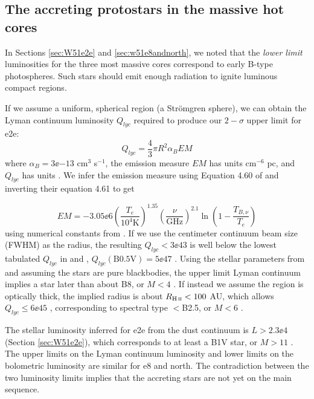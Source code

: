 \documentclass{emulateapj}
\begin{document}
\subsection{The accreting protostars in the massive hot cores}
\label{sec:stellarproperties}
In Sections \ref{sec:W51e2e} and \ref{sec:w51e8andnorth}, we noted that the
\emph{lower limit} luminosities for the three most massive cores correspond to
early B-type photospheres.  Such stars should emit enough radiation to ignite
luminous compact \hii regions. %

If we assume a uniform, spherical \hii region (a Strömgren sphere), we can
obtain the Lyman continuum luminosity $Q_{lyc}$ required to produce our
$2-\sigma$ upper limit for e2e:
\begin{equation}
    Q_{lyc} = \frac{4}{3} \pi R^2 \alpha_B EM
\end{equation}
where $\alpha_B = 3\ee{-13}$ cm$^{3}$ s$^{-1}$, the emission measure $EM$ has
units cm$^{-6}$ pc, and $Q_{lyc}$ has units \pers.  We infer the emission measure
using Equation 4.60 of \citet{Condon2007a} and inverting their equation 4.61 to
get

\begin{equation}
EM = -3.05\ee{6} 
\left(\frac{T_e}{10^4\mathrm{K}}\right)^{1.35}
\left(\frac{\nu}{\mathrm{GHz}}\right)^{2.1}
\ln\left(1-\frac{T_{B,\nu}}{T_e}\right)
\end{equation}
using numerical constants
from \citet{Mezger1967a}.  If we use the centimeter
continuum beam size (FWHM) as the radius, the resulting $Q_{lyc}<3\ee{43}$ \pers 
is well below the lowest tabulated $Q_{lyc}$ in \citet{Vacca1996a} and
\citet{Sternberg2003a},
$Q_{lyc}(\mathrm{B0.5V}) = 5\ee{47}$ \pers.  Using the stellar parameters from
\citet{Pecaut2013a} and assuming the stars are pure blackbodies, the upper
limit Lyman continuum implies a star later than about B8, or $M<4$ \msun.  If
instead we assume the \hii region is optically thick, the implied radius is
about $R_{\scriptsize{\hii}}<100$ AU, which allows $Q_{lyc}\leq6\ee{45}$ \pers,
corresponding to spectral type $<$B2.5, or $M<6$ \msun.  


The stellar luminosity inferred for e2e from the dust continuum is
$L>2.3\ee{4}$ \lsun (Section \ref{sec:W51e2e}), which corresponds to at least a
B1V star, or $M>11$ \msun.  The upper limits on the Lyman continuum luminosity
and lower limits on the bolometric luminosity are similar for e8 and north.
The contradiction between the two luminosity limits implies that the accreting
stars are not yet on the main sequence.
\end{document}
